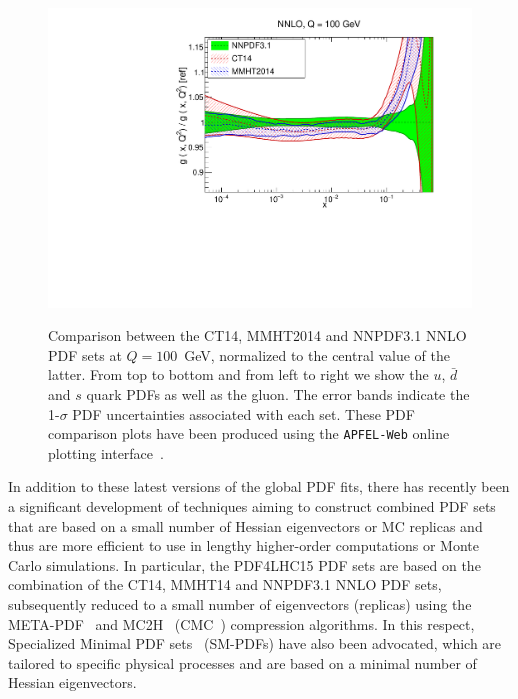\begin{figure}[!t]
 \includegraphics[scale=0.37]{plots/xg-31-nnlo-globalfits.pdf}\\
 \caption{\small Comparison between the CT14, MMHT2014
  and NNPDF3.1 NNLO PDF sets at $Q=100$~GeV, normalized
  to the central value of the latter.
  From top to bottom and from left to right we show the
  $u$, $\bar{d}$ and $s$ quark PDFs as well as the gluon.
  The error bands indicate the 1-$\sigma$ PDF uncertainties
  associated with each set.
  These PDF comparison plots have been produced using the
  {\tt APFEL-Web} online plotting interface~\cite{Carrazza:2014gfa}.
    \label{fig:globalfits}
  }
\end{figure}

In addition to these latest versions of the global PDF fits,
there has recently been a significant development of techniques aiming
to construct combined PDF sets that are based on
a small number of Hessian eigenvectors or MC replicas and thus
are more efficient to use in lengthy higher-order
computations or Monte Carlo simulations.
%
In particular, the PDF4LHC15 PDF sets are based on the
combination of the CT14, MMHT14 and NNPDF3.1 NNLO PDF sets,
subsequently reduced to a small number of eigenvectors
(replicas) using the META-PDF~\cite{Gao:2013bia}
and MC2H~\cite{Carrazza:2015aoa}
(CMC~\cite{Carrazza:2015hva}) compression algorithms.
%
In this respect, Specialized Minimal PDF sets~\cite{Carrazza:2016htc}
(SM-PDFs) have also
been advocated, which
are tailored to specific physical processes and are based
on a minimal number of Hessian eigenvectors.
%

